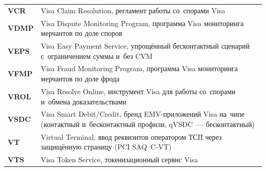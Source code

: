\begin{longtable}{@{}p{4.5em}p{\dimexpr\linewidth-4.5em-2\tabcolsep\relax}@{}}
  \textbf{VCR}               & Visa Claim Resolution, регламент работы со~спорами Visa                                                                                                                                                                                                                                          \\
  \textbf{VDMP}              & Visa Dispute Monitoring Program, программа Visa мониторинга мерчантов по доле споров                                                                                                                                                                                                             \\
  \textbf{VEPS}              & Visa Easy Payment Service, упрощённый бесконтактный сценарий с~ограничением суммы и~без CVM                                                                                                                                                                                                      \\
  \textbf{VFMP}              & Visa Fraud Monitoring Program, программа Visa мониторинга мерчантов по доле фрода                                                                                                                                                                                                                \\
  \textbf{VROL}              & Visa Resolve Online, инструмент Visa для работы со~спорами и~обмена доказательствами                                                                                                                                                                                                             \\
  \textbf{VSDC}              & Visa Smart Debit/Credit, бренд EMV-приложений Visa на~чипе (контактный и~бесконтактный профили, qVSDC~--- бесконтактный)                                                                                                                                                                       \\
  \textbf{VT}                & Virtual Terminal, ввод реквизитов оператором ТСП через защищённую страницу (PCI SAQ~C-VT)                                                                                                                                                                                                        \\
  \textbf{VTS}               & Visa Token Service, токенизационный сервис Visa                                                                                                                                                                                                                                                  \\

\end{longtable}
